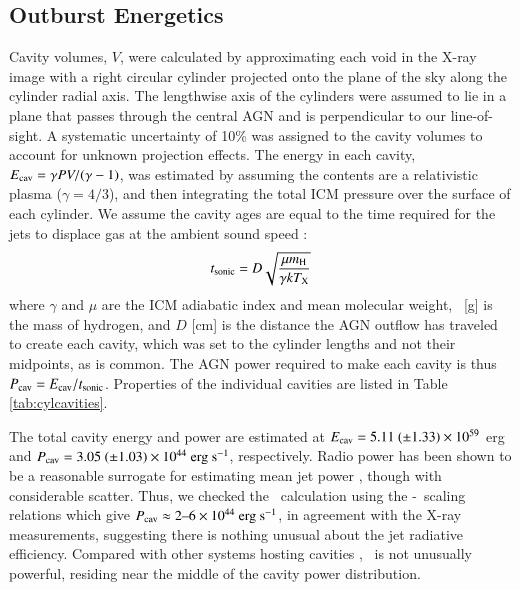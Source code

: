 \documentclass[referee,traditabstract]{aa}
\begin{document}
\subsection{Outburst Energetics}

Cavity volumes, $V$, were calculated by approximating each void in the
X-ray image with a right circular cylinder projected onto the plane of
the sky along the cylinder radial axis. The lengthwise axis of the
cylinders were assumed to lie in a plane that passes through the
central AGN and is perpendicular to our line-of-sight. A systematic
uncertainty of 10\% was assigned to the cavity volumes to account for
unknown projection effects. The energy in each cavity, $E_{\rm{cav}} = \gamma
PV/(\gamma-1)$, was estimated by assuming the contents are a
relativistic plasma ($\gamma = 4/3$), and then integrating the total
ICM pressure over the surface of each cylinder. We assume the cavity
ages are equal to the time required for the jets to displace gas at
the ambient sound speed \citep{birzan04}:
\begin{equation}
  t_{\rm{sonic}} = D\sqrt{\frac{\mu m_{\rm{H}}}{\gamma kT_{\rm{X}}}}
\end{equation}
where $\gamma$ and $\mu$ are the ICM adiabatic index and mean
molecular weight, \mH\ [g] is the mass of hydrogen, and $D$ [cm] is
the distance the AGN outflow has traveled to create each cavity, which
was set to the cylinder lengths and not their midpoints, as is
common. The AGN power required to make each cavity is thus $P_{\rm{cav}} =
E_{\rm{cav}}/t_{\rm{sonic}}$. Properties of the individual cavities are listed in
Table \ref{tab:cylcavities}.

The total cavity energy and power are estimated at $E_{\rm{cav}} = 5.11 ~(\pm
1.33) \times 10^{59}$ erg and $P_{\rm{cav}} = 3.05 ~(\pm 1.03) \times 10^{44}
~\rm{\mbox{\ensuremath{\rm{erg}}}~\ensuremath{\rm{\mbox{\ensuremath{\rm{s}}}^{-1}}}}$, respectively. Radio power has been shown to be a reasonable
surrogate for estimating mean jet power \citep{birzan08}, though with
considerable scatter. Thus, we checked the \pcav\ calculation using
the \citet{pjet} \pcav-\lrad\ scaling relations which give $P_{\rm{cav}}
\approx 2 \mbox{--} 6 \times 10^{44} ~\rm{\mbox{\ensuremath{\rm{erg}}}~\ensuremath{\rm{\mbox{\ensuremath{\rm{s}}}^{-1}}}}$, in agreement with the X-ray
measurements, suggesting there is nothing unusual about the jet
radiative efficiency. Compared with other systems hosting cavities
\citep[\eg][]{birzan04, dunn08}, \irs\ is not unusually powerful,
residing near the middle of the cavity power distribution.
\end{document}
